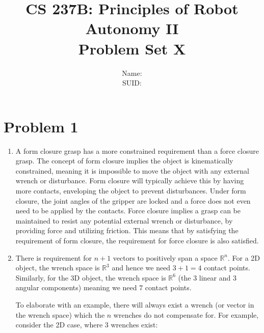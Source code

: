 \documentclass{article}
\title{CS 237B: Principles of Robot Autonomy II \\ Problem Set X}
\author{Name:      \\ SUID:}
\date{}
\begin{document}
\maketitle
\pagestyle{fancy} 




\section*{Problem 1}
\begin{enumerate}[label=(\roman*)]
\item
A form closure grasp has a more constrained requirement than a force closure grasp. The concept of form closure implies the object is kinematically constrained, meaning it is impossible to move the object with any external wrench or disturbance. Form closure will typically achieve this by having more contacts, enveloping the object to prevent disturbances. Under form closure, the joint angles of the gripper are locked and a force does not even need to be applied by the contacts. Force closure implies a grasp can be maintained to resist any potential external wrench or disturbance, by providing force and utilizing friction. This means that by satisfying the requirement of form closure, the requirement for force closure is also satisfied.
\item There is requirement for $n + 1$ vectors to positively span a space $\mathbb{R}^n$. For a 2D object, the wrench space is $\mathbb{R}^3$ and hence we need $3 + 1 = 4$ contact points. Similarly, for the 3D object, the wrench space is $\mathbb{R}^6$ (the 3 linear and 3 angular components) meaning we need $7$ contact points.

To elaborate with an example, there will always exist a wrench (or vector in the wrench space) which the $n$ wrenches do not compensate for. For example, consider the 2D case, where 3 wrenches exist:


\end{enumerate}
\end{document}
